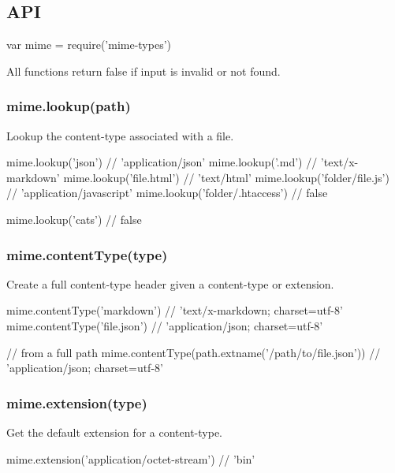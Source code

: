 \subsection*{A\+PI}


\begin{DoxyCode}
var mime = require('mime-types')
\end{DoxyCode}


All functions return {\ttfamily false} if input is invalid or not found.

\subsubsection*{mime.\+lookup(path)}

Lookup the content-\/type associated with a file.


\begin{DoxyCode}
mime.lookup('json')             // 'application/json'
mime.lookup('.md')              // 'text/x-markdown'
mime.lookup('file.html')        // 'text/html'
mime.lookup('folder/file.js')   // 'application/javascript'
mime.lookup('folder/.htaccess') // false

mime.lookup('cats') // false
\end{DoxyCode}


\subsubsection*{mime.\+content\+Type(type)}

Create a full content-\/type header given a content-\/type or extension.


\begin{DoxyCode}
mime.contentType('markdown')  // 'text/x-markdown; charset=utf-8'
mime.contentType('file.json') // 'application/json; charset=utf-8'

// from a full path
mime.contentType(path.extname('/path/to/file.json')) // 'application/json; charset=utf-8'
\end{DoxyCode}


\subsubsection*{mime.\+extension(type)}

Get the default extension for a content-\/type.


\begin{DoxyCode}
mime.extension('application/octet-stream') // 'bin'
\end{DoxyCode}


